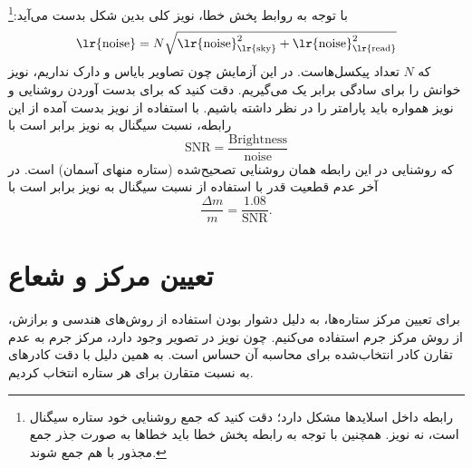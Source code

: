 \documentclass[12pt,a4paper]{article}
\begin{document}
	با توجه به روابط پخش خطا، نویز کلی بدین شکل بدست می‌آید:\footnote{رابطه داخل اسلایدها مشکل دارد؛ دقت کنید که جمع
	روشنایی خود ستاره سیگنال است، نه نویز. همچنین با توجه به رابطه پخش خطا باید خطاها به صورت جذر جمع مجذور با هم
	جمع شوند.}
	\begin{equation}
		\text{\lr{noise}} = N\sqrt{\text{\lr{noise}}_{\text{\lr{sky}}}^2 + \text{\lr{noise}}_{\text{\lr{read}}}^2}
	\end{equation}
	که $N$ تعداد پیکسل‌هاست. در این آزمایش چون تصاویر بایاس و دارک نداریم، نویز خوانش را برای سادگی برابر یک می‌گیریم.
	دقت کنید که برای بدست آوردن روشنایی و نویز همواره باید پارامتر  را در نظر داشته باشیم.
	با استفاده از نویز بدست آمده از این رابطه، نسبت سیگنال به نویز برابر است با
	\begin{equation}
		\mathrm{SNR} = \frac{\mathrm{Brightness}}{\mathrm{noise}}
	\end{equation}
	که روشنایی در این رابطه همان روشنایی تصحیح‌شده (ستاره منهای آسمان) است. در آخر عدم قطعیت قدر با استفاده
	از نسبت سیگنال به نویز برابر است با
	\begin{equation}
		\frac{\Delta m}{m} = \frac{1.08}{\mathrm{SNR}}.
	\end{equation}

	\section{تعیین مرکز و شعاع}
	برای تعیین مرکز ستاره‌ها، به دلیل دشوار بودن استفاده از روش‌های هندسی و برازش، از روش مرکز جرم استفاده می‌کنیم.
	چون نویز در تصویر وجود دارد، مرکز جرم به عدم تقارن کادر انتخاب‌شده برای محاسبه آن حساس است. به همین دلیل با دقت
	کادرهای به نسبت متقارن برای هر ستاره انتخاب کردیم.
	
\end{document}
